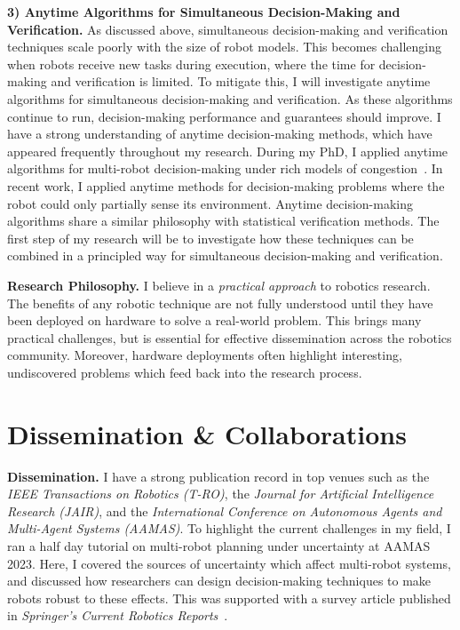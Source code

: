 \documentclass[12pt]{article}
\begin{document}
\vspace*{1ex}\noindent\hypertarget{topicthree}{\textbf{3) Anytime Algorithms for Simultaneous Decision-Making and Verification.}} 
%
As discussed above, simultaneous decision-making and verification techniques scale poorly with the size of robot models.
%
This becomes challenging when robots receive new tasks during execution, where the time for decision-making and verification is limited.
%
To mitigate this, I will investigate anytime algorithms for simultaneous decision-making and verification.
%
As these algorithms continue to run, decision-making performance and guarantees should improve.
%
I have a strong understanding of anytime decision-making methods, which have appeared frequently throughout my research.
%
During my PhD, I applied anytime algorithms for multi-robot decision-making under rich models of congestion~\cite{street2020multi,street2021congestion}.
%
In recent work, I applied anytime methods for decision-making problems where the robot could only partially sense its environment.
%
Anytime decision-making algorithms share a similar philosophy with statistical verification methods.
%
The first step of my research will be to investigate how these techniques can be combined in a principled way for simultaneous decision-making and verification.

\vspace*{1ex}\noindent\textbf{Research Philosophy.} I believe in a \emph{practical approach} to robotics research.
%
The benefits of any robotic technique are not fully understood until they have been deployed on hardware to solve a real-world problem.
%
This brings many practical challenges, but is essential for effective dissemination across the robotics community.
%
Moreover, hardware deployments often highlight interesting, undiscovered problems which feed back into the research process.

\section*{Dissemination \& Collaborations}

\vspace*{1ex}\noindent\textbf{Dissemination.} I have a strong publication record in top venues such as the \emph{IEEE Transactions on Robotics (T-RO)}, the \emph{Journal for Artificial Intelligence Research (JAIR)}, and the \emph{International Conference on Autonomous Agents and Multi-Agent Systems (AAMAS)}.
%
To highlight the current challenges in my field, I ran a half day tutorial on multi-robot planning under uncertainty at AAMAS 2023.
%
Here, I covered the sources of uncertainty which affect multi-robot systems, and discussed how researchers can design decision-making techniques to make robots robust to these effects.
%
This was supported with a survey article published in \emph{Springer's Current Robotics Reports}~\cite{street2023formal}.
\end{document}
